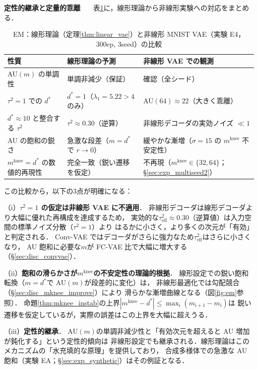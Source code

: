 \documentclass[11pt,a4paper]{jsarticle}
\newcommand{\mknee}{m^{\mathrm{knee}}}
\begin{document}
\textbf{定性的継承と定量的乖離}~~~
表\ref{tab:theory_inherit}に，線形理論から非線形実験への対応をまとめる．

\begin{table}[H]
\centering
\caption{EM：線形理論（定理\ref{thm:linear_vae}）と非線形 MNIST VAE（実験 E4，300ep, 3seed）の比較}
\label{tab:theory_inherit}
\small
\begin{tabular}{lll}
\toprule
性質 & 線形理論の予測 & 非線形 VAE での観測 \\
\midrule
AU$(m)$ の単調性 & 単調非減少（保証） & 確認（全シード） \\
$\tau^2=1$ での $d^*$ & $d^*=1$（$\lambda_1=5.22>4$ のみ） & AU$(64) \approx 22$（大きく乖離） \\
$d^* \approx 10$ と整合する $\tau^2$ & $\tau^2 \approx 0.30$（逆算） & 非線形デコーダの実効ノイズ $\ll 1$ \\
AU の飽和の鋭さ & 急激な段差（$m=d^*$ で $r\to 0$） & 緩やかな漸増（$\sigma=15$ の $\mknee$ 不安定性） \\
$\mknee = d^*$ の数値的再現性 & 完全一致（鋭い遷移を仮定） & 不再現（$\mknee \in \{32,64\}$；§\ref{sec:exp_multiseed2}） \\
\bottomrule
\end{tabular}
\end{table}

この比較から，以下の3点が明確になる：

（i）\textbf{$\tau^2 = 1$ の仮定は非線形 VAE に不適用}．
非線形デコーダは線形デコーダより大幅に優れた再構成を達成するため，
実効的な$\tau^2_{\mathrm{eff}} \approx 0.30$（逆算値）は入力空間の標準ノイズ分散（$\tau^2=1$）より
はるかに小さく，より多くの次元が「有効」と判定される．
Conv-VAE ではデコーダがさらに強力なため$\tau^2_\mathrm{eff}$はさらに小さくなり，
AU 飽和に必要な$m$が FC-VAE 比で大幅に増大する（§\ref{sec:disc_convvae}）．

（ii）\textbf{飽和の滑らかさが$\mknee$の不安定性の理論的根拠}．
線形設定での鋭い飽和転換（$m=d^*$で AU$(m)$が段差的に変化）は，
非線形最適化では勾配競合（§\ref{sec:disc_mknee_improve}）により
滑らかな漸増曲線となる（図\ref{fig:em}参照）．
命題\ref{thm:mknee_instab}の上界$|\mknee - d^*| \leq \max_i(m_{i+1}-m_i)$は
鋭い遷移を仮定しているが，実際の誤差はこの上界を大幅に超えうる．

（iii）\textbf{定性的継承}．
AU$(m)$の単調非減少性と「有効次元を超えると AU 増加が鈍化する」という定性的傾向は
非線形設定でも継承される．線形理論はこのメカニズムの「水充填的な原理」を提供しており，
合成多様体での急激な AU 飽和（実験 EA；§\ref{sec:exp_synthetic}）はその例証となる．
\end{document}
